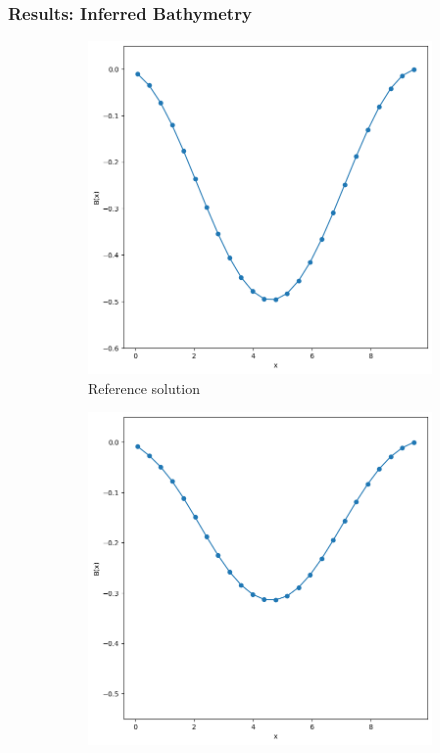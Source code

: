 \begin{frame}
    \frametitle{Results: Inferred Bathymetry}

    \begin{figure}
        \centering
        \begin{subfigure}[b]{0.45\textwidth}
            \centering
            \includegraphics[width=\textwidth]{images/inhomogeneous_swe_pseudospectral_bathymetry.png}
            \caption{Reference solution}
            \label{fig:17_inhomogeneous_pseudospectral_swe_bathymetry}
        \end{subfigure}
        \hfill
        \begin{subfigure}[b]{0.45\textwidth}
            \centering
            \includegraphics[width=\textwidth]{images/inhomogeneous_swe_pinn_bathymetry.png}

\end{subfigure}
\end{figure}
\end{frame}
